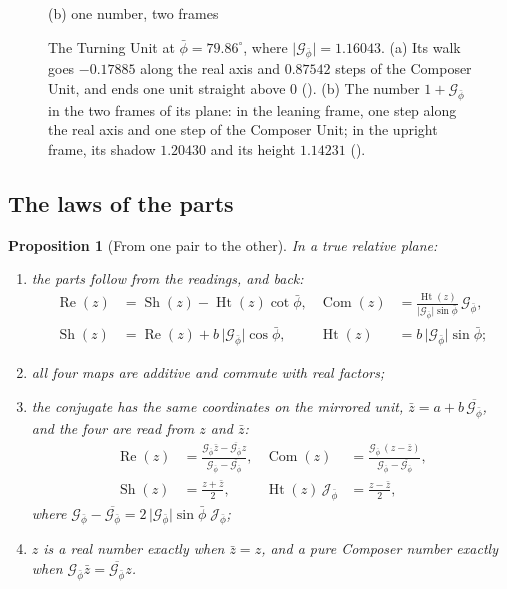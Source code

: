 \documentclass[11pt,a4paper]{amsart}
\theoremstyle{plain}
\newtheorem{proposition}[theorem]{Proposition}
\theoremstyle{definition}
\theoremstyle{remark}
\newcommand{\pb}{\bar{\phi}}                     %
\newcommand{\Gp}{\mathcal{G}_{\bar{\phi}}}       %
\newcommand{\Jp}{\mathcal{J}_{\bar{\phi}}}       %
\renewcommand{\Re}{\operatorname{Re}}            %
\DeclareMathOperator{\Com}{Com}                  %
\DeclareMathOperator{\Sh}{Sh}                    %
\DeclareMathOperator{\Ht}{Ht}                    %
\begin{document}
\begin{figure}[tb]
\begin{minipage}[b]{0.54\textwidth}
\smallskip
{\small (b) one number, two frames\par}
\end{minipage}
\caption{The Turning Unit at $\pb = 79.86^\circ$, where $\lvert\Gp\rvert = 1.16043$. (a) Its walk goes $-0.17885$ along the real axis and $0.87542$ steps of the Composer Unit, and ends one unit straight above $0$ (). (b) The number $1 + \Gp$ in the two frames of its plane: in the leaning frame, one step along the real axis and one step of the Composer Unit; in the upright frame, its shadow $1.20430$ and its height $1.14231$ ().}
\label{fig:turning-unit}
\end{figure}

\subsection{The laws of the parts}\label{subsec:parts-laws}

\begin{proposition}[From one pair to the other]\label{prop:pairs}
In a true relative plane:
\begin{enumerate}
  \item the parts follow from the readings, and back:
  \begin{align*}
  \Re(z) &= \Sh(z) - \Ht(z)\cot\pb , & \Com(z) &= \frac{\Ht(z)}{\lvert\Gp\rvert\sin\pb}\,\Gp , \\
  \Sh(z) &= \Re(z) + b\,\lvert\Gp\rvert\cos\pb , & \Ht(z) &= b\,\lvert\Gp\rvert\sin\pb ;
  \end{align*}
  \item all four maps are additive and commute with real factors;
  \item the conjugate has the same coordinates on the mirrored unit, $\bar{z} = a + b\,\overline{\Gp}$, and the four are read from $z$ and $\bar{z}$:
  \begin{align*}
  \Re(z) &= \frac{\Gp\bar{z} - \overline{\Gp}z}{\Gp - \overline{\Gp}} , & \Com(z) &= \frac{\Gp\,(z - \bar{z})}{\Gp - \overline{\Gp}} , \\
  \Sh(z) &= \frac{z + \bar{z}}{2} , & \Ht(z)\,\Jp &= \frac{z - \bar{z}}{2} ,
  \end{align*}
  where $\Gp - \overline{\Gp} = 2\,\lvert\Gp\rvert\sin\pb\;\Jp$;
  \item $z$ is a real number exactly when $\bar{z} = z$, and a pure Composer number exactly when $\Gp\bar{z} = \overline{\Gp}z$.
\end{enumerate}
\end{proposition}
\end{document}
